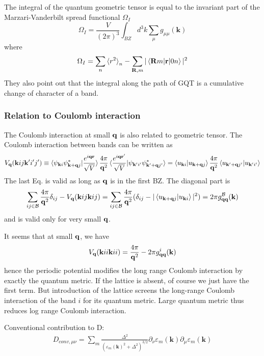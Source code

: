 \documentclass[onecolumn, prb,preprintnumbers,amsmath,amssymb,floatfix]{revtex4}
\renewcommand{\vr}{{\mathbf{r}}}
\newcommand{\vk}{{\mathbf{k}}}
\newcommand{\cb}{{\cal B}}
\begin{document}
The integral of the quantum geometric tensor is equal to the
invariant part of the Marzari-Vanderbilt spread functional $\Omega_{I}$
\begin{equation}
\Omega_I = \frac{V}{(2\pi)^3}\int_{BZ}d^3k\sum_\mu g_{\mu\mu}(\vk)
\end{equation}
where
\begin{equation}
\Omega_I = \sum_n \braket{r^2}_n - \sum_{\vR,m}|\braket{\vR m|\vr|0 n}|^2
\end{equation}  
They also point out that the integral along the path of GQT is a cumulative change of character of a band.


\subsubsection{Relation to Coulomb interaction}
The Coulomb interaction at small ${\mathbf{q}}$ is also related to geometric tensor. The Coulomb interaction between bands can be written as
\begin{eqnarray}
V_\vq(\vk i j \vk' i'j') \equiv \braket{\psi_{\vk i}\psi^*_{\vk+\vq j} |\frac{e^{i\vq \vr}}{\sqrt{V}}}  \frac{4\pi}{\vq^2}
\braket{\frac{e^{i\vq \vr'}}{\sqrt{V}}|\psi_{\vk' i'}\psi^*_{\vk'+\vq j'} } =\braket{u_{\vk i}|u_{\vk+\vq j}}  \frac{4\pi}{\vq^2}
\braket{u_{\vk'+\vq j'} |u_{\vk' i'}} 
\end{eqnarray}
The last Eq. is valid as long as ${\mathbf{q}}$ is in the first BZ.
The diagonal part is
\begin{eqnarray}
 \sum_{ij\in \cb} \frac{4\pi}{\vq^2}\delta_{ij}-V_\vq(\vk i j \vk i j) = \sum_{ij\in \cb} \frac{4\pi}{\vq^2}(\delta_{ij}-
|\braket{u_{\vk+\vq j} |u_{\vk i}}|^2)=2\pi g^\cb_{\vq\vq}(\vk)
\end{eqnarray}  
and is valid only for very small ${\mathbf{q}}$.

It seems that at small ${\mathbf{q}}$, we have
\begin{eqnarray}
V_\vq(\vk i i \vk i i)   = \frac{4\pi}{\vq^2}-2\pi g^i_{\vq\vq}(\vk)
\end{eqnarray}
hence the periodic potential modifies the long range Coulomb
interaction by exactly the quantum metric. If the lattice is absent,
of course we just have the first term. But introduction of the lattice
screens the long-range Coulomb interaction of the band $i$ for its
quantum metric. Large quantum metric thus reduces log range Coulomb interaction.




Conventional contribution to D:
\begin{eqnarray}
  D_{conv,\mu\nu}=\sum_{m}\frac{\Delta^2}{({\varepsilon_m(\vk)^2+\Delta^2})^{3/2}}
  \partial_\nu \varepsilon_m(\vk) \partial_\mu \varepsilon_m(\vk)
\end{eqnarray}
\end{document}
